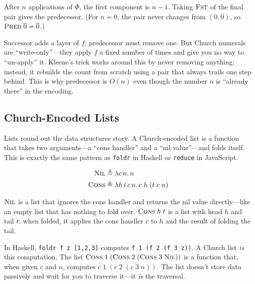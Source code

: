 \documentclass[11pt,a4paper]{article}
\theoremstyle{definition}
\newcommand{\lam}{\lambda}
\newcommand{\church}[1]{\overline{#1}}
\begin{document}
After $n$ applications of $\Phi$, the first component is $n - 1$. Taking
$\textsc{Fst}$ of the final pair gives the predecessor. (For $n = 0$, the pair
never changes from $(0, 0)$, so $\textsc{Pred}\;\church{0} = \church{0}$.)

\begin{intuition}
Successor adds a layer of $f$; predecessor must remove one. But Church numerals
are ``write-only''---they apply $f$ a fixed number of times and give you no way
to ``un-apply'' it. Kleene's trick works around this by never removing anything:
instead, it rebuilds the count from scratch using a pair that always trails one
step behind. This is why predecessor is $O(n)$ even though the number $n$ is
``already there'' in the encoding.
\end{intuition}

\subsection{Church-Encoded Lists}\label{sec:churchlists}

Lists round out the data structures story. A Church-encoded list is a function
that takes two arguments---a ``cons handler'' and a ``nil value''---and folds
itself. This is exactly the same pattern as \texttt{foldr} in Haskell or
\texttt{reduce} in JavaScript.

\begin{defnbox}
\vspace{-0.8em}
\begin{align*}
\textsc{Nil}  &\triangleq \lam c\, n.\, n \\
\textsc{Cons} &\triangleq \lam h\, t\, c\, n.\, c\; h\; (t\; c\; n)
\end{align*}
\end{defnbox}

$\textsc{Nil}$ is a list that ignores the cons handler and returns the nil
value directly---like an empty list that has nothing to fold over.
$\textsc{Cons}\;h\;t$ is a list with head $h$ and tail $t$: when folded, it
applies the cons handler $c$ to $h$ and the result of folding the tail.

\begin{intuition}
In Haskell, \texttt{foldr f z [1,2,3]} computes \texttt{f 1 (f 2 (f 3 z))}.
A Church list \emph{is} this computation. The list
$\textsc{Cons}\;1\;(\textsc{Cons}\;2\;(\textsc{Cons}\;3\;\textsc{Nil}))$
is a function that, when given $c$ and $n$, computes
$c\;1\;(c\;2\;(c\;3\;n))$. The list doesn't store data passively and wait
for you to traverse it---it \emph{is} the traversal.
\end{intuition}
\end{document}
